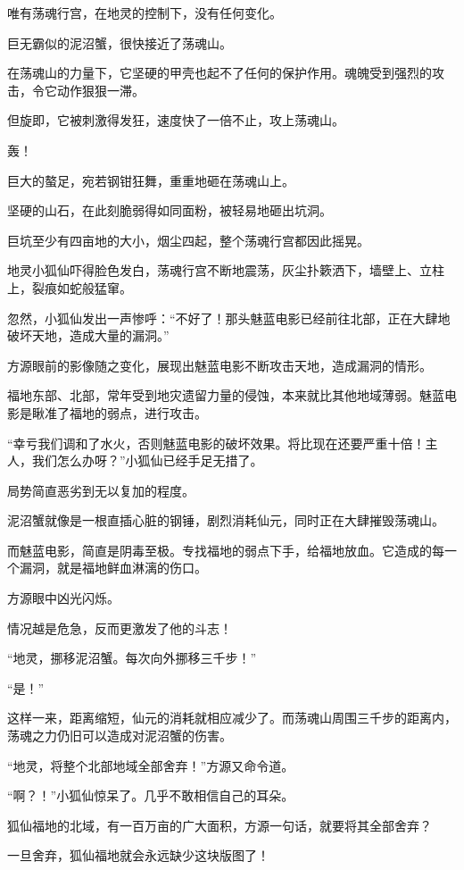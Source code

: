 \begin{this_body}
唯有荡魂行宫，在地灵的控制下，没有任何变化。

巨无霸似的泥沼蟹，很快接近了荡魂山。

在荡魂山的力量下，它坚硬的甲壳也起不了任何的保护作用。魂魄受到强烈的攻击，令它动作狠狠一滞。

但旋即，它被刺激得发狂，速度快了一倍不止，攻上荡魂山。

轰！

巨大的螯足，宛若钢钳狂舞，重重地砸在荡魂山上。

坚硬的山石，在此刻脆弱得如同面粉，被轻易地砸出坑洞。

巨坑至少有四亩地的大小，烟尘四起，整个荡魂行宫都因此摇晃。

地灵小狐仙吓得脸色发白，荡魂行宫不断地震荡，灰尘扑簌洒下，墙壁上、立柱上，裂痕如蛇般猛窜。

忽然，小狐仙发出一声惨呼：“不好了！那头魅蓝电影已经前往北部，正在大肆地破坏天地，造成大量的漏洞。”

方源眼前的影像随之变化，展现出魅蓝电影不断攻击天地，造成漏洞的情形。

福地东部、北部，常年受到地灾遗留力量的侵蚀，本来就比其他地域薄弱。魅蓝电影是瞅准了福地的弱点，进行攻击。

“幸亏我们调和了水火，否则魅蓝电影的破坏效果。将比现在还要严重十倍！主人，我们怎么办呀？”小狐仙已经手足无措了。

局势简直恶劣到无以复加的程度。

泥沼蟹就像是一根直插心脏的钢锤，剧烈消耗仙元，同时正在大肆摧毁荡魂山。

而魅蓝电影，简直是阴毒至极。专找福地的弱点下手，给福地放血。它造成的每一个漏洞，就是福地鲜血淋漓的伤口。

方源眼中凶光闪烁。

情况越是危急，反而更激发了他的斗志！

“地灵，挪移泥沼蟹。每次向外挪移三千步！”

“是！”

这样一来，距离缩短，仙元的消耗就相应减少了。而荡魂山周围三千步的距离内，荡魂之力仍旧可以造成对泥沼蟹的伤害。

“地灵，将整个北部地域全部舍弃！”方源又命令道。

“啊？！”小狐仙惊呆了。几乎不敢相信自己的耳朵。

狐仙福地的北域，有一百万亩的广大面积，方源一句话，就要将其全部舍弃？

一旦舍弃，狐仙福地就会永远缺少这块版图了！


\end{this_body}
